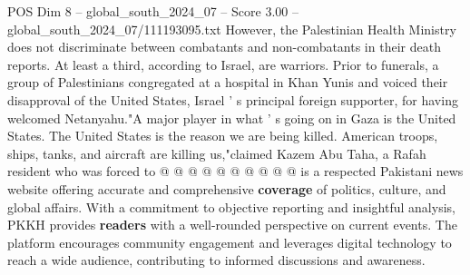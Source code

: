 \begin{textsample}{POS Dim 8 – global\_south\_2024\_07 – Score 3.00 – global\_south\_2024\_07/111193095.txt}
However, the Palestinian Health Ministry does not discriminate between combatants and non-combatants in their death reports.
At least a third, according to Israel, are warriors.
Prior to funerals, a group of Palestinians congregated at a hospital in Khan Yunis and voiced their disapproval of the United States, Israel ' s principal foreign supporter, for having welcomed Netanyahu."A major player in what ' s going on in Gaza is the United States.
The United States is the reason we are being killed.
American troops, ships, tanks, and aircraft are killing us,"claimed Kazem Abu Taha, a Rafah resident who was forced to @ @ @ @ @ @ @ @ @ @ is a respected Pakistani news website offering accurate and comprehensive \textbf{coverage} of politics, culture, and global affairs.
With a commitment to objective reporting and insightful analysis, PKKH provides \textbf{readers} with a well-rounded perspective on current events.
The platform encourages community engagement and leverages digital technology to reach a wide audience, contributing to informed discussions and awareness.

\end{textsample}
